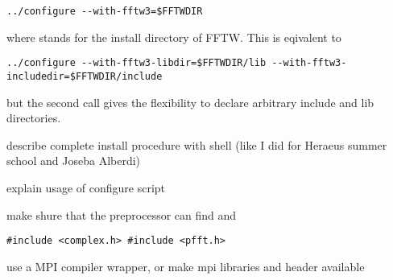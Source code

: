 \begin{lstlisting}
../configure --with-fftw3=$FFTWDIR
\end{lstlisting}
where  stands for the install directory of FFTW. This is eqivalent to
\begin{lstlisting}
../configure --with-fftw3-libdir=$FFTWDIR/lib --with-fftw3-includedir=$FFTWDIR/include
\end{lstlisting}
but the second call gives the flexibility to declare arbitrary include and lib directories.


\begin{compactitem}
  \item[\mybox] describe complete install procedure with shell (like I did for Heraeus summer school and Joseba Alberdi)
  \item[\mybox] explain usage of configure script
  \item[\mybox] make shure that the preprocessor can find  and 
  \item[\mybox] \verb+#include <complex.h> #include <pfft.h>+
  \item[\mybox] use a MPI compiler wrapper, or make mpi libraries and header available
\end{compactitem}
